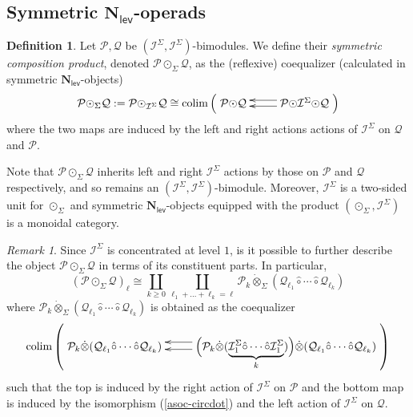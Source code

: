 \documentclass[11pt]{amsart}
\theoremstyle{definition}
\newtheorem{definition}[subsection]{Definition}
\theoremstyle{remark}
\newtheorem{remark}[subsection]{Remark}
\newcommand{\colim}{\operatorname{colim}}
\newcommand{\Cal}[1]{\mathcal{#1}}
\newcommand{\circhat}{\hat{\circ}}
\newcommand{\circdot}{{\odot}}
\newcommand{\tensordot}{\dot{\otimes}}
\newcommand{\Nl}{\mathbf{N}_{\mathsf{lev}}}
\newcommand{\Isym}{\Cal{I}^{\Sigma}}
\begin{document}
\subsection{Symmetric $\Nl$-operads}

\begin{definition} Let $\Cal{P},\Cal{Q}$ be $(\Isym,\Isym)$-bimodules. We define their \textit{symmetric composition product}, denoted $\Cal{P}\circdot_{\Sigma} \Cal{Q}$, as the (reflexive) coequalizer (calculated in symmetric $\Nl$-objects)\[ 
    \Cal{P}\circdot_{\Sigma} \Cal{Q} :=\Cal{P}\circdot_{\Cal{I}^{\Sigma}} \Cal{Q}\cong \colim \left( \xymatrix{
        \Cal{P}\circdot \Cal{Q} &
        \Cal{P}\circdot \Cal{I}^{\Sigma} \circdot \Cal{Q} \ar@<.5ex>[l] \ar@<-.75ex>[l] }
    \right) \]
where the two maps are induced by the left and right actions actions of $\Cal{I}^{\Sigma}$ on $\Cal{Q}$ and $\Cal{P}$.
\end{definition}

Note that $\Cal{P}\circdot_{\Sigma} \Cal{Q}$ inherits left and right $\Isym$ actions by those on $\Cal{P}$ and $\Cal{Q}$ respectively, and so remains an $(\Isym,\Isym)$-bimodule. Moreover, $\Cal{I}^{\Sigma}$ is a two-sided unit for $\circdot_{\Sigma}$ and symmetric $\Nl$-objects equipped with the product $(\circdot_{\Sigma}, \Isym)$ is a monoidal category. 
\begin{remark}
Since $\Isym$ is concentrated at level $1$, is it possible to further describe the object $\Cal{P}\circdot_{\Sigma} \Cal{Q}$ in terms of its constituent parts. In particular, \begin{equation*}
    (\Cal{P}\circdot_{\Sigma} \Cal{Q})_{\ell} \cong \coprod_{k\geq 0} \coprod_{\ell_1+\dots+\ell_k=\ell} \Cal{P}_{k} \tensordot_{\Sigma} ( \Cal{Q}_{\ell_1}\circhat \cdots \circhat \Cal{Q}_{\ell_k})
\end{equation*}
where $\Cal{P}_{k} \tensordot_{\Sigma} ( \Cal{Q}_{\ell_1}\circhat \cdots \circhat \Cal{Q}_{\ell_k})$ is obtained as the coequalizer \begin{equation*}
    \colim \left( \xymatrix{
        \Cal{P}_k \tensordot (\Cal{Q}_{\ell_1}\circhat \cdots \circhat \Cal{Q}_{\ell_k}) &
        \Big( \Cal{P}_k \tensordot (\underbrace{\Isym_1 \circhat \cdots \circhat \Isym_1}_k) \Big) \tensordot  (\Cal{Q}_{\ell_1}\circhat \cdots \circhat \Cal{Q}_{\ell_k}) \ar@<-1ex>[l] \ar@<.5ex>[l]
    } \right) 
\end{equation*}
such that the top is induced by the right action of $\Isym$ on $\Cal{P}$ and the bottom map is induced by the isomorphism (\ref{asoc-circdot}) and the left action of $\Isym$ on $\Cal{Q}$.
\end{remark}
\end{document}

